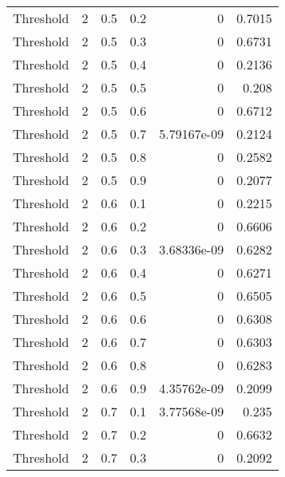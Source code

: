\documentclass{article}
\begin{document}
\begin{longtable}[H]{lrrrrr}
 Threshold      &       2 &   0.5 &            0.2 &      0           &          0.7015 \\
 Threshold      &       2 &   0.5 &            0.3 &      0           &          0.6731 \\
 Threshold      &       2 &   0.5 &            0.4 &      0           &          0.2136 \\
 Threshold      &       2 &   0.5 &            0.5 &      0           &          0.208  \\
 Threshold      &       2 &   0.5 &            0.6 &      0           &          0.6712 \\
 Threshold      &       2 &   0.5 &            0.7 &      5.79167e-09 &          0.2124 \\
 Threshold      &       2 &   0.5 &            0.8 &      0           &          0.2582 \\
 Threshold      &       2 &   0.5 &            0.9 &      0           &          0.2077 \\
 Threshold      &       2 &   0.6 &            0.1 &      0           &          0.2215 \\
 Threshold      &       2 &   0.6 &            0.2 &      0           &          0.6606 \\
 Threshold      &       2 &   0.6 &            0.3 &      3.68336e-09 &          0.6282 \\
 Threshold      &       2 &   0.6 &            0.4 &      0           &          0.6271 \\
 Threshold      &       2 &   0.6 &            0.5 &      0           &          0.6505 \\
 Threshold      &       2 &   0.6 &            0.6 &      0           &          0.6308 \\
 Threshold      &       2 &   0.6 &            0.7 &      0           &          0.6303 \\
 Threshold      &       2 &   0.6 &            0.8 &      0           &          0.6283 \\
 Threshold      &       2 &   0.6 &            0.9 &      4.35762e-09 &          0.2099 \\
 Threshold      &       2 &   0.7 &            0.1 &      3.77568e-09 &          0.235  \\
 Threshold      &       2 &   0.7 &            0.2 &      0           &          0.6632 \\
 Threshold      &       2 &   0.7 &            0.3 &      0           &          0.2092 \\

\end{longtable}
\end{document}
